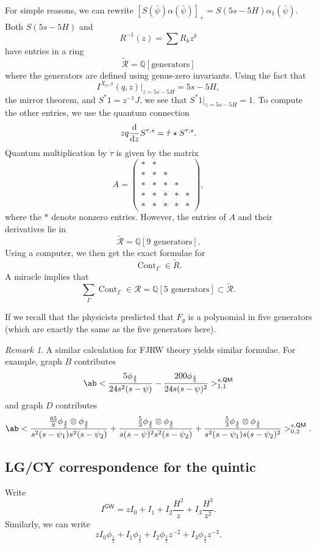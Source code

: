 \documentclass[10pt]{amsart}
\theoremstyle{definition}
\theoremstyle{remark}
\newtheorem{rmk}[thm]{Remark}
\theoremstyle{plain}
\theoremstyle{definition}
\theoremstyle{remark}
\newcommand{\Q}{\mathbb{Q}}
\newcommand{\mc}[1]{\mathcal{#1}}
\newcommand{\ms}[1]{\mathsf{#1}}
\newcommand{\1}{\mathbf{1}}
\newcommand{\2}{\mathbf{2}}
\newcommand{\3}{\mathbf{3}}
\newcommand{\GW}{\ms{GW}}
\newcommand{\QM}{\ms{QM}}
\DeclareMathOperator{\Cont}{Cont}
\begin{document}
For simple reasons, we can rewrite $[S(\bar{\psi})\alpha(\bar{\psi})]_+ = S(5s-5H) \alpha_1(\bar{\psi})$. Both $S(5s-5H)$ and
\[ R^{-1}(z) = \sum R_k z^k \]
have entries in a ring
\[ \tilde{\mc{R}} = \Q[\text{generators}] \]
where the generators are defined using genus-zero invariants. Using the fact that
\[ I^{X_5,s}(q,z)|_{z = 5s-5H} = 5s-5H, \]
the mirror theorem, and $S^* 1 = z^{-1}J$, we see that $S^* 1 |_{z=5s-5H} = 1$. To compute the other entries, we use the quantum connection
\[ z q \odv{}{z}S^{\tau,s} = \dot{\tau} \star S^{\tau,s}. \]
Quantum multiplication by $\dot{\tau}$ is given by the matrix
\[ A = \begin{pmatrix}
    * & * \\
    * & * & * \\
    * & * & * & * \\
    * & * & * & * & * \\
    * & * & * & * & * 
\end{pmatrix}, \]
where the $*$ denote nonzero entries. However, the entries of $A$ and their derivatives lie in 
\[ \tilde{\mc{R}} = \Q[\text{$9$ generators}]. \]
Using a computer, we then get the exact formulae for
\[ \Cont_{\Gamma} \in \tilde{R}. \]
A miracle implies that
\[ \sum_{\Gamma} \Cont_{\Gamma} \in \mc{R} = \Q[\text{$5$ generators}] \subset \tilde{\mc{R}}. \]

If we recall that the physicists predicted that $F_g$ is a polynomial in five generators (which are exactly the same as the five generators here).

\begin{rmk}
    A similar calculation for FJRW theory yields similar formulae. For example, graph $B$ contributes
    \[ \ab<\frac{5 \phi_{\frac{4}{5}}}{24s^2(s-\psi)} - \frac{200 \phi_{\frac{4}{5}}}{24s(s-\psi)^2}>_{1,1}^{s,\QM} \]
    and graph $D$ contributes
    \[ \ab<\frac{\frac{65}{8} \phi_{\frac{4}{5}} \otimes \phi_{\frac{4}{5}}}{s^2(s-\psi_1)s^2(s-\psi_2)} + \frac{\frac{5}{3} \phi_{\frac{4}{5}} \otimes \phi_{\frac{4}{5}}}{s(s-\psi)^2 s^2 (s-\psi_2)} + \frac{\frac{5}{3} \phi_{\frac{4}{5}} \otimes \phi_{\frac{4}{5}}}{s^2(s-\psi_1)s(s-\psi_2)^2}>_{0,2}^{s,\QM}. \]
\end{rmk}

\subsection{LG/CY correspondence for the quintic}%
\label{sub:LG/CY correspondence for the quintic}

Write
\[ I^{\GW} = z I_0 + I_1 + I_2 \frac{H^2}{z} + I_3 \frac{H^3}{z^2}. \]
Similarly, we can write
\[ z I_0 \phi_{\frac{1}{5}} + I_1 \phi_{\frac{2}{5}} + I_2 \phi_{\frac{3}{5}} z^{-2} + I_3 \phi_{\frac{4}{5}} z^{-3}. \]
\end{document}
